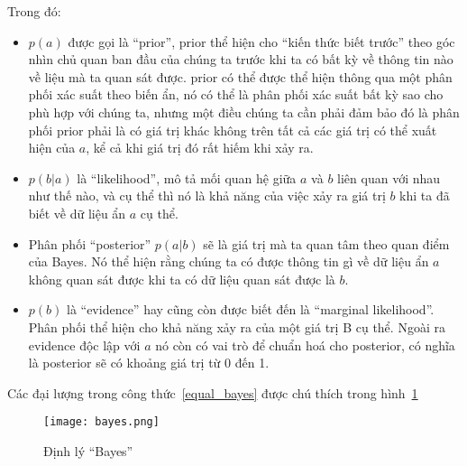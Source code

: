         Trong đó: 
        \begin{itemize}
            \item $p(a)$ được gọi là ``prior'', prior thể hiện cho ``kiến thức biết trước'' theo góc nhìn chủ quan ban đầu của chúng ta trước khi ta có bất kỳ về thông tin nào về liệu mà ta quan sát được.
            prior có thể được thể hiện thông qua một phân phối xác suất theo biến ẩn, nó có thể là phân phối xác suất bất kỳ sao cho phù hợp với chúng ta, nhưng một điều chúng ta cần phải đảm bảo đó là phân phối prior phải là có giá trị khác không trên tất cả các giá trị có thể xuất hiện của $a$, kể cả khi giá trị đó rất hiếm khi xảy ra.

            \item $p(b|a)$ là ``likelihood'', mô tả mối quan hệ giữa $a$ và $b$ liên quan với nhau như thế nào, và cụ thể thì nó là khả năng của việc xảy ra giá trị $b$ khi ta đã biết về dữ liệu ẩn $a$ cụ thể.
            
            \item Phân phối ``posterior'' $p(a|b)$ sẽ là giá trị mà ta quan tâm theo quan điểm của Bayes. Nó thể hiện rằng chúng ta có được thông tin gì về dữ liệu ẩn $a$ không quan sát được  khi ta có dữ liệu quan sát được là  $b$.
            
            \item $p(b)$ là ``evidence'' hay cũng còn được biết đến là ``marginal likelihood''. Phân phối thể hiện cho khả năng xảy ra của một giá trị B cụ thể. Ngoài ra evidence độc lập với $a$ nó còn có vai trò để chuẩn hoá cho posterior, có nghĩa là posterior sẽ có khoảng giá trị từ 0 đến 1.
        \end{itemize}
        Các đại lượng trong công thức~\ref{equal_bayes} được chú thích trong hình~\ref{fig_bayes}


        \begin{figure}
            \centering
            \texttt{[image: bayes.png]}
            \caption{Định lý ``Bayes''}
            \label{fig_bayes}
        \end{figure}
        
